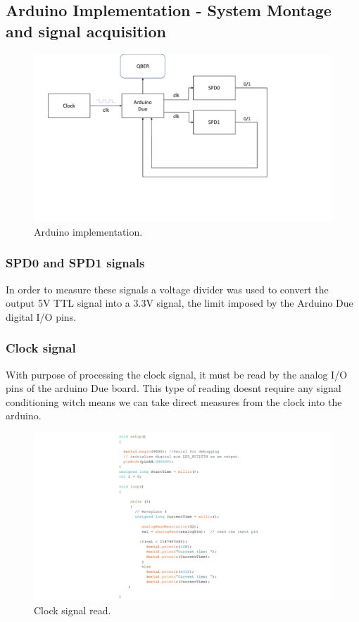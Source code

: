 \begin{refsection}
\subsection{Arduino Implementation - System Montage and signal acquisition}
\begin{figure}[H]
	\centering
	\includegraphics[width=1\linewidth]{./sdf/arduino_quantum_rx/figures/montageDiagram.pdf}
	\caption{Arduino implementation.}
	\label{montage}
\end{figure}

\subsubsection{SPD0 and SPD1 signals}

In order to measure these signals a voltage divider was used to convert the output 5V TTL signal into a 3.3V signal, the limit imposed by the Arduino Due digital I/O pins. 

\subsubsection{Clock signal}

With purpose of processing the clock signal, it must be read by the analog I/O pins of the arduino Due board. This type of reading doesnt require any signal conditioning witch means we can take direct measures from the clock into the arduino.

\begin{figure}[H]
	\centering
	\includegraphics[width=1\linewidth]{./sdf/arduino_quantum_rx/figures/clockRead.pdf}
	\caption{Clock signal read.}
	\label{montage}
\end{figure}



\end{refsection}
